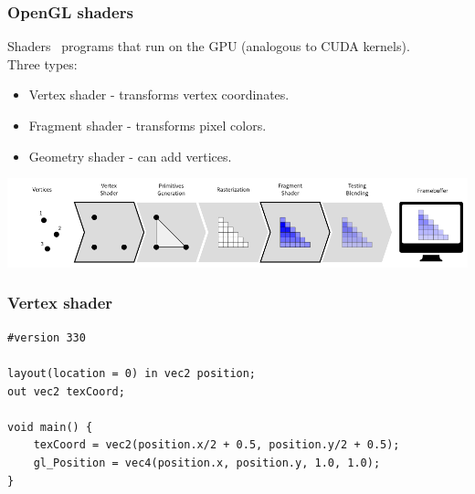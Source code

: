 \begin{frame}[fragile]

\frametitle{OpenGL shaders}

Shaders \textrightarrow $\,$ programs that run on the GPU (analogous to CUDA kernels).
\newline
\\
Three types:
\begin{itemize}
    \item{Vertex shader - transforms vertex coordinates.}
    \item{Fragment shader - transforms pixel colors.}
    \item{Geometry shader - can add vertices.}
\end{itemize}

\begin{center}
\includegraphics[width=\textwidth]{images/shaders.png}
\end{center}

\end{frame}

\begin{frame}[fragile]

\frametitle{Vertex shader}

\begin{lstlisting}
#version 330

layout(location = 0) in vec2 position;
out vec2 texCoord;

void main() {
    texCoord = vec2(position.x/2 + 0.5, position.y/2 + 0.5);
    gl_Position = vec4(position.x, position.y, 1.0, 1.0);
}
\end{lstlisting}

\end{frame}

